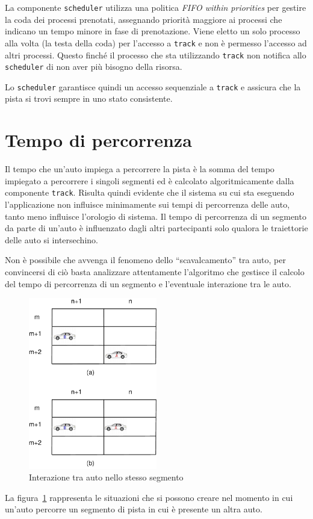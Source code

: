 La componente \texttt{scheduler} utilizza una politica \textit{FIFO within priorities} per gestire la coda dei processi prenotati, assegnando priorità maggiore ai processi che indicano un tempo minore in fase di prenotazione. Viene eletto un solo processo alla volta (la testa della coda) per l'accesso a \texttt{track} e non è permesso l'accesso ad altri processi. Questo finché il processo che sta utilizzando \texttt{track} non notifica allo \texttt{scheduler} di non aver più bisogno della risorsa.

Lo \texttt{scheduler} garantisce quindi un accesso sequenziale a \texttt{track} e assicura che la pista si trovi sempre in uno stato consistente.

\section{Tempo di percorrenza}
Il tempo che un'auto impiega a percorrere la pista è la somma del tempo impiegato a percorrere i singoli segmenti ed è calcolato algoritmicamente dalla componente \texttt{track}. Risulta quindi evidente che il sistema su cui sta eseguendo l'applicazione non influisce minimamente sui tempi di percorrenza delle auto, tanto meno influisce l'orologio di sistema. Il tempo di percorrenza di un segmento da parte di un'auto è influenzato dagli altri partecipanti solo qualora le traiettorie delle auto si intersechino.

Non è possibile che avvenga il fenomeno dello ``scavalcamento'' tra auto, per convincersi di ciò basta analizzare attentamente l'algoritmo che gestisce il calcolo del tempo di percorrenza di un segmento e l'eventuale interazione tra le auto.

\begin{figure}
\begin{center}
\includegraphics[width=0.5\textwidth]{diagrammi/Surpass}
\caption{Interazione tra auto nello stesso segmento}
\label{fig:surpass}
\end{center}
\end{figure}
La figura~\ref{fig:surpass} rappresenta le situazioni che si possono creare nel momento in cui un'auto percorre un segmento di pista in cui è presente un altra auto.

